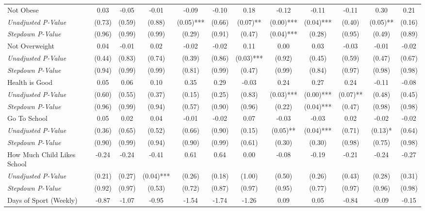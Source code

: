 \begin{tabular}{l c c c c c c c c c c c}
Not Obese & 0.03 & -0.05 & -0.01 & -0.09 & -0.10 & 0.18 & -0.12 & -0.11 & -0.11 & 0.30 & 0.21 \\
\quad \textit{Unadjusted P-Value} & (0.73) & (0.59) & (0.88) & (0.05)*** & (0.66) & (0.07)** & (0.00)*** & (0.04)*** & (0.40) & (0.05)** & (0.16) \\
\quad \textit{Stepdown P-Value} & (0.96) & (0.99) & (0.99) & (0.29) & (0.91) & (0.47) & (0.04)*** & (0.28) & (0.95) & (0.49) & (0.89) \\
Not Overweight & 0.04 & -0.01 & 0.02 & -0.02 & -0.02 & 0.11 & 0.00 & 0.03 & -0.03 & -0.01 & -0.02 \\
\quad \textit{Unadjusted P-Value} & (0.44) & (0.83) & (0.74) & (0.39) & (0.86) & (0.03)*** & (0.92) & (0.45) & (0.59) & (0.47) & (0.67) \\
\quad \textit{Stepdown P-Value} & (0.94) & (0.99) & (0.99) & (0.81) & (0.99) & (0.47) & (0.99) & (0.84) & (0.97) & (0.98) & (0.98) \\
Health is Good & 0.05 & 0.06 & 0.10 & 0.35 & 0.29 & -0.03 & 0.24 & 0.27 & 0.24 & -0.11 & -0.08 \\
\quad \textit{Unadjusted P-Value} & (0.60) & (0.55) & (0.37) & (0.15) & (0.25) & (0.83) & (0.03)*** & (0.00)*** & (0.07)** & (0.48) & (0.45) \\
\quad \textit{Stepdown P-Value} & (0.96) & (0.99) & (0.94) & (0.57) & (0.90) & (0.96) & (0.22) & (0.04)*** & (0.47) & (0.98) & (0.98) \\
Go To School & 0.05 & 0.02 & 0.04 & -0.01 & -0.02 & 0.07 & -0.03 & -0.03 & 0.02 & -0.02 & -0.02 \\
\quad \textit{Unadjusted P-Value} & (0.36) & (0.65) & (0.52) & (0.66) & (0.90) & (0.15) & (0.05)** & (0.04)*** & (0.71) & (0.13)* & (0.64) \\
\quad \textit{Stepdown P-Value} & (0.90) & (0.99) & (0.94) & (0.90) & (0.99) & (0.61) & (0.30) & (0.30) & (0.98) & (0.75) & (0.98) \\
How Much Child Likes School & -0.24 & -0.24 & -0.41 & 0.61 & 0.64 & 0.00 & -0.08 & -0.19 & -0.21 & -0.24 & -0.27 \\
\quad \textit{Unadjusted P-Value} & (0.21) & (0.27) & (0.04)*** & (0.26) & (0.18) & (1.00) & (0.50) & (0.26) & (0.43) & (0.28) & (0.31) \\
\quad \textit{Stepdown P-Value} & (0.92) & (0.97) & (0.53) & (0.72) & (0.87) & (0.97) & (0.95) & (0.77) & (0.97) & (0.96) & (0.98) \\
Days of Sport (Weekly) & -0.87 & -1.07 & -0.95 & -1.54 & -1.74 & -1.26 & 0.09 & 0.05 & -0.84 & -0.09 & -0.15 \\

\end{tabular}
